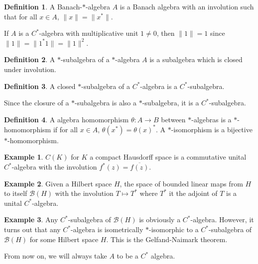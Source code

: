 \documentclass[]{article}
\theoremstyle{definition}
\newtheorem{definition}{Definition}[section]
\newtheorem{example}{Example}[section]
\begin{document}
\begin{definition}
  A Banach-\(*\)-algebra \(A\) is a Banach algebra with an involution such that for all \(x \in A\), 
  \(\|x\| = \|x^*\|\).
\end{definition}

If \(A\) is a \(C^*\)-algebra with multiplicative unit \(1 \ne 0\), then \(\|1\| = 1\) since 
\(\|1\| = \|1^* 1\| = \|1\|^2\).

\begin{definition}
  A \(*\)-subalgebra of a \(*\)-algebra \(A\) is a subalgebra which is closed under involution.
\end{definition}

\begin{definition}
  A closed \(*\)-subalgebra of a \(C^*\)-algebra is a \(C^*\)-subalgebra.
\end{definition}

Since the closure of a \(*\)-subalgebra is also a \(*\)-subalgebra, it is a \(C^*\)-subalgebra.

\begin{definition}
  A algebra homomorphism \(\theta : A \to B\) between \(*\)-algebras is a \(*\)-homomorphism 
  if for all \(x \in A\), \(\theta(x^*) = \theta(x)^*\). A \(*\)-isomorphism is a bijective 
  \(*\)-homomorphism.
\end{definition}

\begin{example}
  \(C(K)\) for \(K\) a compact Hausdorff space is a commutative unital \(C^*\)-algebra with the involution 
  \(f^*(z) = \overline{f(z)}\).
\end{example}

\begin{example}
  Given a Hilbert space \(H\), the space of bounded linear maps from \(H\) to itself \(\mathcal{B}(H)\) 
  with the involution \(T \mapsto T^*\) where \(T^*\) it the adjoint of \(T\) is a unital \(C^*\)-algebra.
\end{example}

\begin{example}
  Any \(C^*\)-subalgebra of \(\mathcal{B}(H)\) is obviously a \(C^*\)-algebra. However, it turns out 
  that any \(C^*\)-algebra is isometrically \(*\)-isomorphic to a \(C^*\)-subalgebra of \(\mathcal{B}(H)\) 
  for some Hilbert space \(H\). This is the Gelfand-Naimark theorem.
\end{example}

From now on, we will always take \(A\) to be a \(C^*\) algebra.
\end{document}
